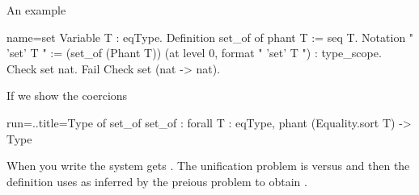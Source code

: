 An example

\begin{coq}{name=set}{}
Variable T : eqType.
Definition set_of of phant T := seq T.
Notation "{ 'set' T }" := (set_of (Phant T))
  (at level 0, format "{ 'set'  T }") : type_scope.
Check {set nat}.
Fail Check {set (nat -> nat)}.
\end{coq}

If we show the coercions

\begin{coqout}{run=..}{title=Type of set\_of}
	set_of : forall T : eqType, phant (Equality.sort T) -> Type
\end{coqout}

When you write  the system gets
.
The unification problem is  versus 
and then the definition uses  as inferred by the preious
problem to obtain .

%
%
